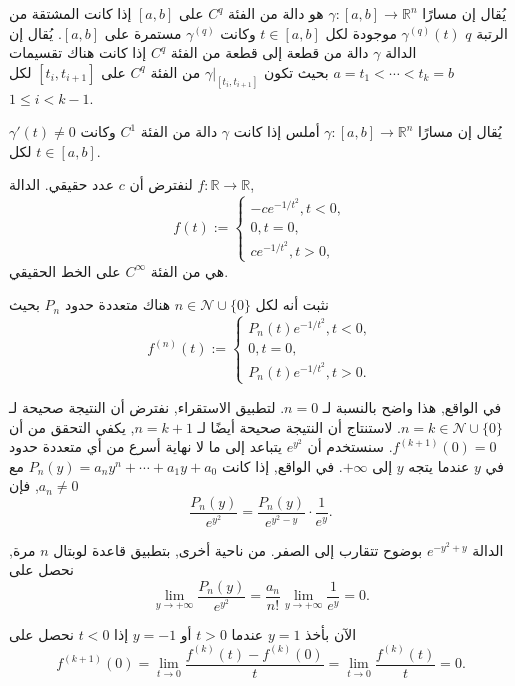 \begin{definition}
    
يُقال إن مسارًا \( \gamma : [a, b] \to \mathbb{R}^n \) هو دالة من الفئة \( C^q \) على $[a,b]$ إذا كانت المشتقة من الرتبة \( q \) \( \gamma^{(q)}(t) \) موجودة لكل \( t \in [a, b] \) وكانت \( \gamma^{(q)} \) مستمرة على $[a,b]$. يُقال إن الدالة \( \gamma \) دالة من قطعة إلى قطعة من الفئة \( C^q \) إذا كانت هناك تقسيمات \( a = t_1 < \cdots < t_k = b \) بحيث تكون \( \gamma|_{[t_i, t_{i+1}]} \) من الفئة \( C^q \) على \(\left[t_i,t_{i+1}\right]\) لكل $1\leq i < k-1$.
\end{definition}

\begin{definition}
    
يُقال إن مسارًا \( \gamma : [a, b] \to \mathbb{R}^n \) أملس إذا كانت \( \gamma \) دالة من الفئة \( C^1 \) وكانت \( \gamma'(t) \neq 0 \) لكل \( t \in [a, b] \).
\end{definition}

\begin{lemma}
لنفترض أن \( c \) عدد حقيقي. الدالة \( f : \mathbb{R} \to \mathbb{R} \),
\[ f(t) := \begin{cases} -c e^{-1/t^2}, t < 0, \\ 0, t = 0, \\ c e^{-1/t^2}, t > 0, \end{cases} \]
هي من الفئة \( C^\infty \) على الخط الحقيقي.
\end{lemma}

\begin{demonstration}[5]

نثبت أنه لكل \( n \in \mathcal{N} \cup \{0\} \) هناك متعددة حدود \( P_n \) بحيث
\[ f^{(n)}(t) := \begin{cases} P_n(t) e^{-1/t^2}, t < 0, \\ 0, t = 0, \\ P_n(t) e^{-1/t^2}, t > 0. \end{cases} \]

في الواقع, هذا واضح بالنسبة لـ \( n = 0 \). لتطبيق الاستقراء, نفترض أن النتيجة صحيحة لـ \( n = k \in \mathcal{N} \cup \{0\} \). لاستنتاج أن النتيجة صحيحة أيضًا لـ \( n = k + 1 \), يكفي التحقق من أن \( f^{(k+1)}(0) = 0 \). سنستخدم أن \( e^{y^2} \) يتباعد إلى ما لا نهاية أسرع من أي متعددة حدود في \( y \) عندما يتجه \( y \) إلى \( +\infty \). في الواقع, إذا كانت \( P_n(y) = a_n y^n + \cdots + a_1 y + a_0 \) مع \( a_n \neq 0 \), فإن
\[ \frac{P_n(y)}{e^{y^2}} = \frac{P_n(y)}{e^{y^2 - y}} \cdot \frac{1}{e^y}. \]

الدالة \( e^{-y^2 + y} \) بوضوح تتقارب إلى الصفر. من ناحية أخرى, بتطبيق قاعدة لوبتال \( n \) مرة, نحصل على
\[ \lim_{y \to +\infty} \frac{P_n(y)}{e^{y^2}} = \frac{a_n}{n!} \lim_{y \to +\infty} \frac{1}{e^y} = 0. \]

الآن بأخذ \( y = 1 \) عندما \( t > 0 \) أو \( y = -1 \) إذا \( t < 0 \) نحصل على
\[ f^{(k+1)}(0) = \lim_{t \to 0} \frac{f^{(k)}(t) - f^{(k)}(0)}{t} = \lim_{t \to 0} \frac{f^{(k)}(t)}{t} = 0. \]
\end{demonstration}

